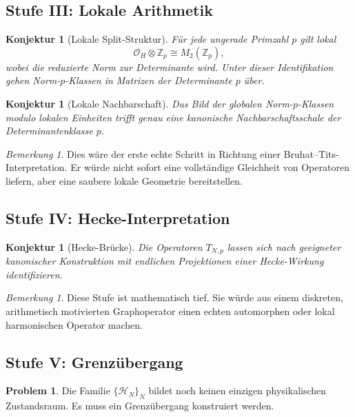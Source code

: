 \documentclass[12pt,a4paper]{article}
\theoremstyle{plain}
\newtheorem{konjektur}[satz]{Konjektur}
\theoremstyle{definition}
\newtheorem{problem}[satz]{Problem}
\theoremstyle{remark}
\newtheorem{bemerkung}[satz]{Bemerkung}
\newcommand{\OH}{\mathcal O_H}
\newcommand{\HN}{\mathcal H_N}
\newcommand{\Zp}{\mathbb Z_p}
\begin{document}
	\subsection{Stufe III: Lokale Arithmetik}
	
	\begin{konjektur}[Lokale Split-Struktur]
		Für jede ungerade Primzahl \(p\) gilt lokal
		\[
		\OH \otimes \Zp \cong M_2(\Zp),
		\]
		wobei die reduzierte Norm zur Determinante wird. Unter dieser Identifikation gehen
		Norm-\(p\)-Klassen in Matrizen der Determinante \(p\) über.
	\end{konjektur}
	
	\begin{konjektur}[Lokale Nachbarschaft]
		Das Bild der globalen Norm-\(p\)-Klassen modulo lokalen Einheiten trifft genau eine
		kanonische Nachbarschaftsschale der Determinantenklasse \(p\).
	\end{konjektur}
	
	\begin{bemerkung}
		Dies wäre der erste echte Schritt in Richtung einer Bruhat--Tits-Interpretation. Er würde
		nicht sofort eine vollständige Gleichheit von Operatoren liefern, aber eine saubere lokale
		Geometrie bereitstellen.
	\end{bemerkung}
	
	\subsection{Stufe IV: Hecke-Interpretation}
	
	\begin{konjektur}[Hecke-Brücke]
		Die Operatoren \(T_{N,p}\) lassen sich nach geeigneter kanonischer Konstruktion mit endlichen
		Projektionen einer Hecke-Wirkung identifizieren.
	\end{konjektur}
	
	\begin{bemerkung}
		Diese Stufe ist mathematisch tief. Sie würde aus einem diskreten, arithmetisch motivierten
		Graphoperator einen echten automorphen oder lokal harmonischen Operator machen.
	\end{bemerkung}
	
	\subsection{Stufe V: Grenzübergang}
	
	\begin{problem}
		Die Familie \(\{\HN\}_N\) bildet noch keinen einzigen physikalischen Zustandsraum. Es muss
		ein Grenzübergang konstruiert werden.
	\end{problem}
	
\end{document}

